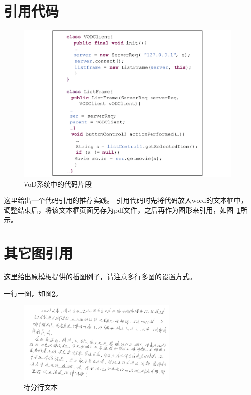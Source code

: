 \section{引用代码}

\begin{figure}[htb]
  \centering
  \includegraphics[width=\linewidth]{figure/chapter4/VoDCodeSample.pdf}
  \caption{VoD系统中的代码片段}
  \label{fig:VoDCodeSample}
\end{figure}

这里给出一个代码引用的推荐实践。
引用代码时先将代码放入word的文本框中，调整结束后，将该文本框页面另存为pdf文件，之后再作为图形来引用，如图~\ref{fig:VoDCodeSample}所示。

\section{其它图引用}

这里给出原模板提供的插图例子，请注意多行多图的设置方式。

一行一图，如图\ref{fig:line}。
\begin{figure}[htbp]
	\centering
	\includegraphics[width=0.7\textwidth]{figure/chapter4/line.png} %
	\caption{待分行文本}
	\label{fig:line}
\end{figure}


